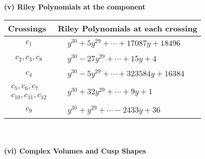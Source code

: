 \documentclass[1p]{elsarticle_modified}
\theoremstyle{definition}
\begin{document}
\newpage\renewcommand{\arraystretch}{1}
\flushleft \textbf{(v) Riley Polynomials at the component}\newline \\
\begin{tabular}{m{50pt}|m{274pt}}
Crossings & \hspace{64pt}Riley Polynomials at each crossing \\
\hline $$\begin{aligned}c_{1}\end{aligned}$$&$\begin{aligned}
&y^{30}+5 y^{29}+\cdots+17087 y+18496
\end{aligned}$\\
\hline $$\begin{aligned}c_{2},c_{3},c_{8}\end{aligned}$$&$\begin{aligned}
&y^{30}-27 y^{29}+\cdots+15 y+4
\end{aligned}$\\
\hline $$\begin{aligned}c_{4}\end{aligned}$$&$\begin{aligned}
&y^{30}-5 y^{29}+\cdots+323584 y+16384
\end{aligned}$\\
\hline $$\begin{aligned}c_{5},c_{6},c_{7}\\c_{10},c_{11},c_{12}\end{aligned}$$&$\begin{aligned}
&y^{30}+32 y^{29}+\cdots+9 y+1
\end{aligned}$\\
\hline $$\begin{aligned}c_{9}\end{aligned}$$&$\begin{aligned}
&y^{30}+y^{29}+\cdots-2433 y+36
\end{aligned}$\\
\hline
\end{tabular}\\~\\
\newpage\flushleft \textbf{(vi) Complex Volumes and Cusp Shapes}
\end{document}
